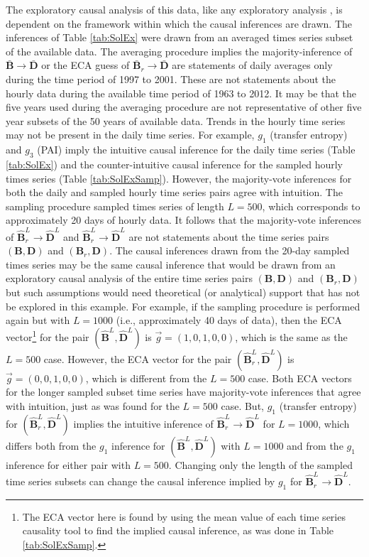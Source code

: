 \documentclass{article}[10pt]
\begin{document}
The exploratory causal analysis of this data, like any exploratory analysis \cite{Tukey1977}, is dependent on the framework within which the causal inferences are drawn.  The inferences of Table \ref{tab:SolEx} were drawn from an averaged times series subset of the available data.  The averaging procedure implies the majority-inference of $\bar{\mathbf{B}}\rightarrow\bar{\mathbf{D}}$ or the ECA guess of $\bar{\mathbf{B}}_r\rightarrow\bar{\mathbf{D}}$ are statements of daily averages only during the time period of 1997 to 2001.  These are not statements about the hourly data during the available time period of 1963 to 2012.  It may be that the five years used during the averaging procedure are not representative of other five year subsets of the 50 years of available data.  Trends in the hourly time series may not be present in the daily time series.  For example, $g_1$ (transfer entropy) and $g_3$ (PAI) imply the intuitive causal inference for the daily time series (Table \ref{tab:SolEx}) and the counter-intuitive causal inference for the sampled hourly times series (Table \ref{tab:SolExSamp}).  However, the majority-vote inferences for both the daily and sampled hourly time series pairs agree with intuition.  The sampling procedure sampled times series of length $L=500$, which corresponds to approximately 20 days of hourly data.  It follows that the majority-vote inferences of $\hat{\mathbf{B}}^L_r\rightarrow\hat{\mathbf{D}}^L$ and $\hat{\mathbf{B}}^L_r\rightarrow\hat{\mathbf{D}}^L$ are not statements about the time series pairs $(\mathbf{B},\mathbf{D})$ and $(\mathbf{B}_r,\mathbf{D})$.  The causal inferences drawn from the 20-day sampled times series may be the same causal inference that would be drawn from an exploratory causal analysis of the entire time series pairs $(\mathbf{B},\mathbf{D})$ and $(\mathbf{B}_r,\mathbf{D})$ but such assumptions would need theoretical (or analytical) support that has not be explored in this example.  For example, if the sampling procedure is performed again but with $L=1000$ (i.e., approximately 40 days of data), then the ECA vector\footnote{The ECA vector here is found by using the mean value of each time series causality tool to find the implied causal inference, as was done in Table \ref{tab:SolExSamp}.} for the pair $(\hat{\mathbf{B}}^L,\hat{\mathbf{D}}^L)$ is $\vec{g}=(1,0,1,0,0)$, which is the same as the $L=500$ case.  However, the ECA vector for the pair $(\hat{\mathbf{B}}^L_r,\hat{\mathbf{D}}^L)$ is $\vec{g}=(0,0,1,0,0)$, which is different from the $L=500$ case.  Both ECA vectors for the longer sampled subset time series have majority-vote inferences that agree with intuition, just as was found for the $L=500$ case.  But, $g_1$ (transfer entropy) for $(\hat{\mathbf{B}}^L_r,\hat{\mathbf{D}}^L)$ implies the intuitive inference of $\hat{\mathbf{B}}^L_r\rightarrow\hat{\mathbf{D}}^L$ for $L=1000$, which differs both from the $g_1$ inference for $(\hat{\mathbf{B}}^L,\hat{\mathbf{D}}^L)$ with $L=1000$ and from the $g_1$ inference for either pair with $L=500$.  Changing only the length of the sampled time series subsets can change the causal inference implied by $g_1$ for $\hat{\mathbf{B}}^L_r\rightarrow\hat{\mathbf{D}}^L$.
\end{document}
